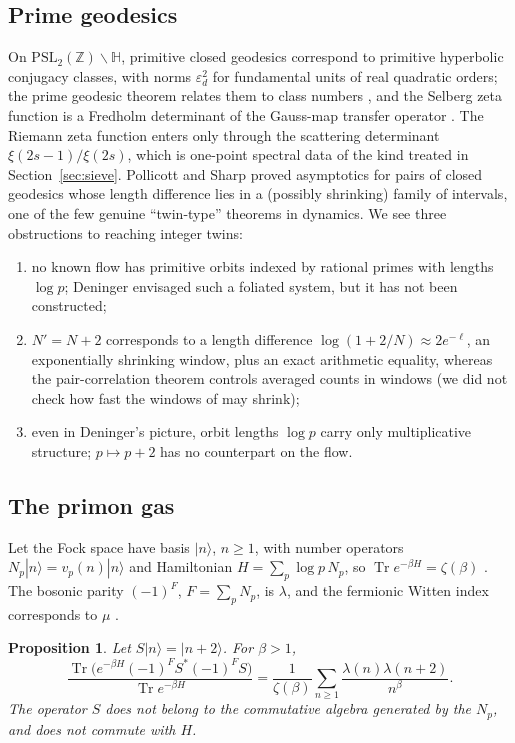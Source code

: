 \documentclass[11pt]{amsart}
\newtheorem{proposition}[theorem]{Proposition}
\theoremstyle{definition}
\theoremstyle{remark}
\newcommand{\Z}{\mathbb{Z}}
\newcommand{\Tr}{\operatorname{Tr}}
\begin{document}
\subsection{Prime geodesics}
On $\mathrm{PSL}_2(\Z)\backslash\mathbb H$, primitive closed geodesics correspond to primitive hyperbolic conjugacy classes, with norms $\varepsilon_d^2$ for fundamental units of real quadratic orders; the prime geodesic theorem relates them to class numbers \cite{Sar82}, and the Selberg zeta function is a Fredholm determinant of the Gauss-map transfer operator \cite{May91}. The Riemann zeta function enters only through the scattering determinant $\xi(2s-1)/\xi(2s)$, which is one-point spectral data of the kind treated in Section~\ref{sec:sieve}. Pollicott and Sharp \cite{PS06} proved asymptotics for pairs of closed geodesics whose length difference lies in a (possibly shrinking) family of intervals, one of the few genuine ``twin-type'' theorems in dynamics. We see three obstructions to reaching integer twins:
\begin{enumerate}
\item no known flow has primitive orbits indexed by rational primes with lengths $\log p$; Deninger \cite{Den98} envisaged such a foliated system, but it has not been constructed;
\item $N'=N+2$ corresponds to a length difference $\log(1+2/N)\approx2e^{-\ell}$, an exponentially shrinking window, plus an exact arithmetic equality, whereas the pair-correlation theorem controls averaged counts in windows (we did not check how fast the windows of \cite{PS06} may shrink);
\item even in Deninger's picture, orbit lengths $\log p$ carry only multiplicative structure; $p\mapsto p+2$ has no counterpart on the flow.
\end{enumerate}

\subsection{The primon gas}
Let the Fock space have basis $|n\rangle$, $n\ge1$, with number operators $N_p|n\rangle=v_p(n)|n\rangle$ and Hamiltonian $H=\sum_p\log p\,N_p$, so $\Tr e^{-\beta H}=\zeta(\beta)$ \cite{Jul90}. The bosonic parity $(-1)^F$, $F=\sum_pN_p$, is $\lambda$, and the fermionic Witten index corresponds to $\mu$ \cite{Spe90}.

\begin{proposition}\label{prop:primon}
Let $S|n\rangle=|n+2\rangle$. For $\beta>1$,
\[
\frac{\Tr\bigl(e^{-\beta H}(-1)^FS^*(-1)^FS\bigr)}{\Tr e^{-\beta H}}=\frac1{\zeta(\beta)}\sum_{n\ge1}\frac{\lambda(n)\lambda(n+2)}{n^\beta}.
\]
The operator $S$ does not belong to the commutative algebra generated by the $N_p$, and does not commute with $H$.
\end{proposition}
\end{document}
